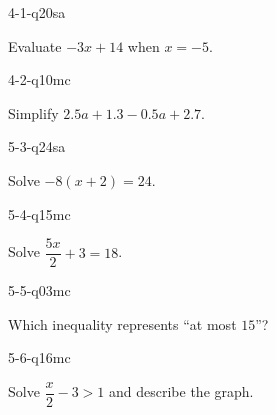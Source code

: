 \begin{practiceQuestion}{4-1-q20}{sa}
\begin{questionText}
Evaluate $-3x + 14$ when $x = -5$.
\end{questionText}
\end{practiceQuestion}

\begin{practiceQuestion}{4-2-q10}{mc}
\begin{questionText}
Simplify $2.5a + 1.3 - 0.5a + 2.7$.
\end{questionText}
\end{practiceQuestion}

\begin{practiceQuestion}{5-3-q24}{sa}
\begin{questionText}
Solve $-8(x + 2) = 24$.
\end{questionText}
\end{practiceQuestion}

\begin{practiceQuestion}{5-4-q15}{mc}
\begin{questionText}
Solve $\dfrac{5x}{2} + 3 = 18$.
\end{questionText}
\end{practiceQuestion}

\begin{practiceQuestion}{5-5-q03}{mc}
\begin{questionText}
Which inequality represents ``at most $15$''?
\end{questionText}
\end{practiceQuestion}

\begin{practiceQuestion}{5-6-q16}{mc}
\begin{questionText}
Solve $\dfrac{x}{2} - 3 > 1$ and describe the graph.
\end{questionText}
\end{practiceQuestion}

